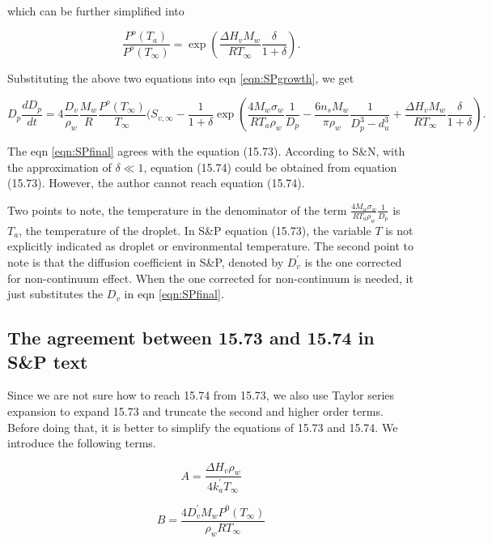 \documentclass[12pt]{amsart}
\begin{document}
which can be further simplified into 

\begin{equation}\label{eqn:CC}
\frac{P^{o}(T_{a})}{P^{o}(T_{\infty})}=\exp (\frac{\Delta H_{v} M_{w}}{R T_{\infty}} \frac{\delta}{1+\delta}).
\end{equation}

Substituting the above two equations into eqn \ref{eqn:SPgrowth}, we get

\begin{equation}\label{eqn:SPfinal}
D_{p}\frac{dD_{p}}{dt}=4 \frac{D_{v}} {\rho_{w}} \frac{M_{w}}{R} \frac{P^{o}(T_{\infty})} {T_{\infty}} (S_{v, \infty} - \frac{1}{1+\delta} \exp(\frac{4 M_{w}\sigma_{w}}{R T_{a} \rho_w}\frac{1}{D_{p}}-\frac{6 n_{s} M_{w}}{\pi \rho_{w}} \frac{1}{D_{p}^{3}-d_{u}^{3}}+\frac{\Delta H_{v} M_{w}}{R T_{\infty}} \frac{\delta}{1+\delta}).
\end{equation}

The eqn \ref{eqn:SPfinal} agrees with the equation (15.73). According to S\&N, with the approximation of $\delta \ll 1$, equation (15.74) could be obtained from equation (15.73).  However, the author cannot reach equation (15.74).

Two points to note, the temperature in the denominator of the term  $\frac{4 M_{w}\sigma_{w}}{R T_{a} \rho_w}\frac{1}{D_{p}}$ is $T_{a}$, the temperature of the droplet. In S\&P equation (15.73), the variable $T$ is not explicitly indicated as droplet or environmental temperature. The second point to note is that the diffusion coefficient in S\&P, denoted by $D_{v}^{'}$  is the one corrected for non-continuum effect. When the one corrected for non-continuum is needed, it just substitutes the $D_{v}$ in eqn \ref{eqn:SPfinal}.

\subsection{The agreement between 15.73 and 15.74 in S\&P text}

Since we are not sure how to reach 15.74 from 15.73, we also use Taylor series expansion to expand 15.73 and truncate the second and higher order terms. Before doing that, it is better to simplify the equations of 15.73 and 15.74. We introduce the following terms.

\begin{equation}
A=\frac{\Delta H_{v} \rho_w}{4 k_a^{'} T_{\infty}}
\end{equation}

\begin{equation}
B=\frac{4 D_{v}^{'} M_{w} P^{0}(T_{\infty})}{\rho_w R T_{\infty}}
\end{equation}
\end{document}
